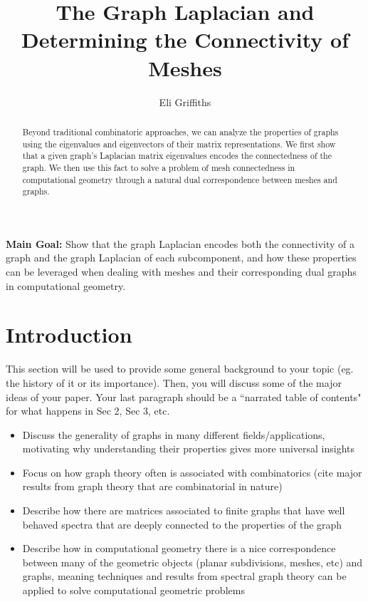 \documentclass{article}
\title{The Graph Laplacian and Determining the Connectivity of Meshes}
\author{Eli Griffiths}
\date{}
\begin{document}
\maketitle

\begin{abstract}
    Beyond traditional combinatoric approaches, we can analyze the properties of graphs using the eigenvalues and eigenvectors of their matrix representations. We first show that a given graph's Laplacian matrix eigenvalues encodes the connectedness of the graph. We then use this fact to solve a problem of mesh connectedness in computational geometry through a natural dual correspondence between meshes and graphs.

\end{abstract}

\bigskip

\noindent \textbf{Main Goal:} Show that the graph Laplacian encodes both the connectivity of a graph and the graph Laplacian of each subcomponent, and how these properties can be leveraged when dealing with meshes and their corresponding dual graphs in computational geometry.


\section{Introduction}

This section will be used to provide some general background to your topic (eg. the history of it or its importance). Then, you will discuss some of the major ideas of your paper.  Your last paragraph should be a ``narrated table of contents" for what happens in Sec 2, Sec 3, etc.

\begin{itemize}
    \item Discuss the generality of graphs in many different fields/applications, motivating why understanding their properties gives more universal insights
    \item Focus on how graph theory often is associated with combinatorics (cite major results from graph theory that are combinatorial in nature)
    \item Describe how there are matrices associated to finite graphs that have well behaved spectra that are deeply connected to the properties of the graph
    \item Describe how in computational geometry there is a nice correspondence between many of the geometric objects (planar subdivisions, meshes, etc) and graphs, meaning techniques and results from spectral graph theory can be applied to solve computational geometric problems
\end{itemize}
\end{document}
